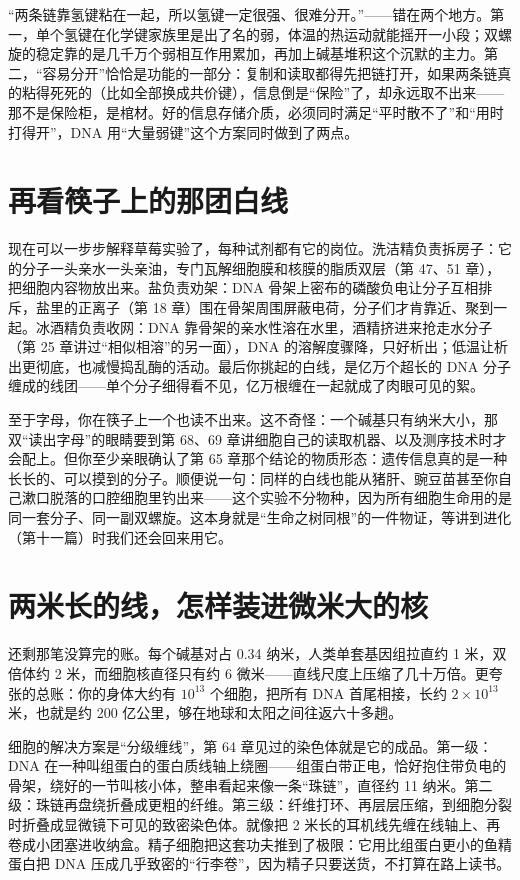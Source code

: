 \begin{wuqu}
“两条链靠氢键粘在一起，所以氢键一定很强、很难分开。”——错在两个地方。第一，单个氢键在化学键家族里是出了名的弱，体温的热运动就能摇开一小段；双螺旋的稳定靠的是几千万个弱相互作用累加，再加上碱基堆积这个沉默的主力。第二，“容易分开”恰恰是功能的一部分：复制和读取都得先把链打开，如果两条链真的粘得死死的（比如全部换成共价键），信息倒是“保险”了，却永远取不出来——那不是保险柜，是棺材。好的信息存储介质，必须同时满足“平时散不了”和“用时打得开”，DNA 用“大量弱键”这个方案同时做到了两点。
\end{wuqu}

\section{再看筷子上的那团白线}

现在可以一步步解释草莓实验了，每种试剂都有它的岗位。洗洁精负责拆房子：它的分子一头亲水一头亲油，专门瓦解细胞膜和核膜的脂质双层（第 47、51 章），把细胞内容物放出来。盐负责劝架：DNA 骨架上密布的磷酸负电让分子互相排斥，盐里的正离子（第 18 章）围在骨架周围屏蔽电荷，分子们才肯靠近、聚到一起。冰酒精负责收网：DNA 靠骨架的亲水性溶在水里，酒精挤进来抢走水分子（第 25 章讲过“相似相溶”的另一面），DNA 的溶解度骤降，只好析出；低温让析出更彻底，也减慢捣乱酶的活动。最后你挑起的白线，是亿万个超长的 DNA 分子缠成的线团——单个分子细得看不见，亿万根缠在一起就成了肉眼可见的絮。

至于字母，你在筷子上一个也读不出来。这不奇怪：一个碱基只有纳米大小，那双“读出字母”的眼睛要到第 68、69 章讲细胞自己的读取机器、以及测序技术时才会配上。但你至少亲眼确认了第 65 章那个结论的物质形态：遗传信息真的是一种长长的、可以摸到的分子。顺便说一句：同样的白线也能从猪肝、豌豆苗甚至你自己漱口脱落的口腔细胞里钓出来——这个实验不分物种，因为所有细胞生命用的是同一套分子、同一副双螺旋。这本身就是“生命之树同根”的一件物证，等讲到进化（第十一篇）时我们还会回来用它。

\section{两米长的线，怎样装进微米大的核}

还剩那笔没算完的账。每个碱基对占 0.34 纳米，人类单套基因组拉直约 1 米，双倍体约 2 米，而细胞核直径只有约 6 微米——直线尺度上压缩了几十万倍。更夸张的总账：你的身体大约有 $10^{13}$ 个细胞，把所有 DNA 首尾相接，长约 $2\times 10^{13}$ 米，也就是约 200 亿公里，够在地球和太阳之间往返六十多趟。

细胞的解决方案是“分级缠线”，第 64 章见过的染色体就是它的成品。第一级：DNA 在一种叫组蛋白的蛋白质线轴上绕圈——组蛋白带正电，恰好抱住带负电的骨架，绕好的一节叫核小体，整串看起来像一条“珠链”，直径约 11 纳米。第二级：珠链再盘绕折叠成更粗的纤维。第三级：纤维打环、再层层压缩，到细胞分裂时折叠成显微镜下可见的致密染色体。就像把 2 米长的耳机线先缠在线轴上、再卷成小团塞进收纳盒。精子细胞把这套功夫推到了极限：它用比组蛋白更小的鱼精蛋白把 DNA 压成几乎致密的“行李卷”，因为精子只要送货，不打算在路上读书。

